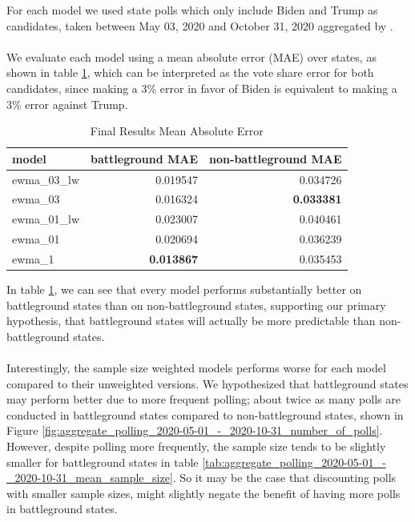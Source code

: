 For each model we used state polls which only include Biden and Trump as candidates, taken between May 03, 2020 and October 31, 2020 aggregated by \cite{fivethirtyeight}.
\\~\\
We evaluate each model using a mean absolute error (MAE) over states, as shown in table \ref{tab:all_models_final_mae}, which can be interpreted as the vote share error for both candidates, since making a 3\% error in favor of Biden is equivalent to making a 3\% error against Trump. 
\begin{table}[H]
\centering
\caption{Final Results Mean Absolute Error}
\begin{tabular}{lrr}
\toprule
      model &  battleground MAE &  non-battleground MAE \\
\midrule
 ewma\_03\_lw &          0.019547 &              0.034726 \\
    ewma\_03 &          0.016324 &              {\bf 0.033381} \\
 ewma\_01\_lw &          0.023007 &              0.040461 \\
    ewma\_01 &          0.020694 &              0.036239 \\
     ewma\_1 &          {\bf 0.013867} &              0.035453 \\
\bottomrule
\end{tabular}
    \label{tab:all_models_final_mae}
\end{table}

In table \ref{tab:all_models_final_mae}, we can see that every model performs substantially better on battleground states than on non-battleground states, supporting our primary hypothesis, that battleground states will actually be more predictable than non-battleground states.
\\~\\
Interestingly, the sample size weighted models performs worse for each model compared to their unweighted versions. We hypothesized that battleground states may perform better due to more frequent polling; about twice as many polls are conducted in battleground states compared to non-battleground states, shown in Figure \ref{fig:aggregate_polling_2020-05-01_-_2020-10-31_number_of_polls}. However, despite polling more frequently, the sample size tends to be slightly smaller for battleground states in table \ref{tab:aggregate_polling_2020-05-01_-_2020-10-31_mean_sample_size}. So it may be the case that discounting polls with smaller sample sizes, might slightly negate the benefit of having more polls in battleground states. 

